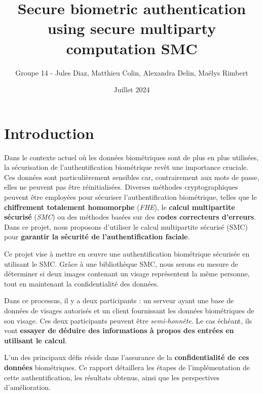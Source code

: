 \documentclass[12pt,a4paper]{article}
\title{Secure biometric authentication using secure multiparty computation SMC}
\author{Groupe 14 - Jules Diaz, Matthieu Colin, Alexandra Delin, Maëlys Rimbert}
\date{Juillet 2024}
\begin{document}
\maketitle
\thispagestyle{empty}
\begin{center}
\end{center}

\cfoot{} %
\tableofcontents

\newpage

\setcounter{page}{1}
\pagestyle{fancy}
\fancyfoot[C]{\thepage} %

\section{Introduction}
Dans le contexte actuel où les données biométriques sont de plus en plus utilisées, la sécurisation de l'authentification biométrique revêt une importance cruciale. Ces données sont particulièrement sensibles car, contrairement aux mots de passe, elles ne peuvent pas être réinitialisées. Diverses méthodes cryptographiques peuvent être employées pour sécuriser l'authentification biométrique, telles que le \textbf{chiffrement totalement homomorphe} (\textit{FHE}), le \textbf{calcul multipartite sécurisé} (\textit{SMC}) ou des méthodes basées sur des \textbf{codes correcteurs d'erreurs}. Dans ce projet, nous proposons d'utiliser le calcul multipartite sécurisé (SMC) pour \textbf{garantir la sécurité de l'authentification faciale}.

Ce projet vise à mettre en œuvre une authentification biométrique sécurisée en utilisant le SMC. Grâce à une bibliothèque SMC, nous serons en mesure de déterminer si deux images contenant un visage représentent la même personne, tout en maintenant la confidentialité des données. 

Dans ce processus, il y a deux participants : un serveur ayant une base de données de visages autorisés et un client fournissant les données biométriques de son visage.
Ces deux participants peuvent être \textit{semi-honnête}. Le cas échéant, ils vont \textbf{essayer de déduire des informations à propos des entrées en utilisant le calcul}. 

L'un des principaux défis réside dans l'assurance de la \textbf{confidentialité de ces données} biométriques. Ce rapport détaillera les étapes de l'implémentation de cette authentification, les résultats obtenus, ainsi que les perspectives d'amélioration.
\end{document}
